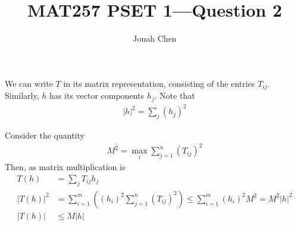 \documentclass[a4paper]{article}
\title{MAT257 PSET 1---Question 2}
\author{Jonah Chen}
\numberwithin{equation}{section}
\begin{document}
    \sffamily
    We can write $T$ in its matrix representation, consisting of the entries $T_{ij}$. Similarly, $h$ has its vector components $h_j$. 
    Note that \begin{align*}
        |h|^2=\sum_j (h_j)^2
    \end{align*}



    Consider the quantity
    \begin{align*}
        M^2=\max_{i}\sum_{j=1}^n (T_{ij})^2
    \end{align*}
    Then, as matrix multiplication is
    \begin{align*}
        T(h)&=\sum_j T_{ij}h_j\\
        |T(h)|^2&=\sum_{i=1}^m\left((h_i)^2\sum_{j=1}^n(T_{ij})^2\right)\leq\sum_{i=1}^m(h_i)^2M^2=M^2|h|^2\\
        |T(h)|&\leq M|h|
    \end{align*}
\end{document}
